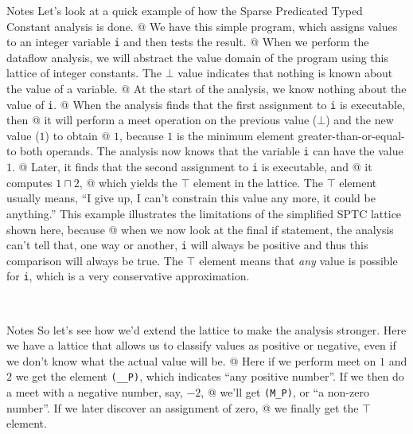 \documentclass[%
pdf,
colorBG,
slideColor,
nototal,
oqe
]{prosper}
\newcommand{\meet}{\ensuremath{\sqcap}}
\newenvironment{talknotes}{\begin{slide}{Notes}\tiny}{\end{slide}}
\begin{document}
\begin{talknotes}
Let's look at a quick example of how the Sparse Predicated Typed
Constant analysis is done. @ We have this simple program, which
assigns values to an integer variable {\tt i} and then tests the
result.  @ When we perform the dataflow analysis, we will abstract the
value domain of the program using this lattice of integer
constants.  The $\bot$ value indicates that nothing is known about the
value of a variable. @ At the start of the analysis, we know nothing
about the value of {\tt i}. @ When the analysis finds that the first
assignment to {\tt i} is executable, then @ it will perform a meet
operation on the previous value ($\bot$) and the new value ($1$) to
obtain @ $1$, because $1$ is the minimum element
greater-than-or-equal-to both operands.  The analysis now knows that
the variable {\tt i} can have the value $1$. @ Later, it finds that
the second assignment to {\tt i} is executable, and @ it computes
$1 \meet 2$, @ which yields the $\top$ element in the lattice.
The $\top$ element usually means, ``I give up, I can't constrain
this value any more, it could be anything.''  This example illustrates
the limitations of the simplified SPTC lattice shown here, because @
when we now look at the final if statement, the analysis can't tell
that, one way or another, {\tt i} will always be positive and thus
this comparison will always be true.  The $\top$ element means that
\emph{any} value is possible for {\tt i}, which is a very conservative
approximation.

~%
\end{talknotes}


\begin{talknotes}
So let's see how we'd extend the lattice to make the analysis
stronger.  Here we have a lattice that allows us to classify
values as positive or negative, even if we don't know what the
actual value will be. @ Here if we perform meet on $1$ and $2$ we get the
element {\tt (\_\_P)}, which indicates ``any positive number''.
If we then do a meet with a negative number, say, $-2$, @ we'll
get {\tt (M\_P)}, or ``a non-zero number''.  If we later discover
an assignment of zero, @ we finally get the $\top$ element.
\end{talknotes}
\end{document}
